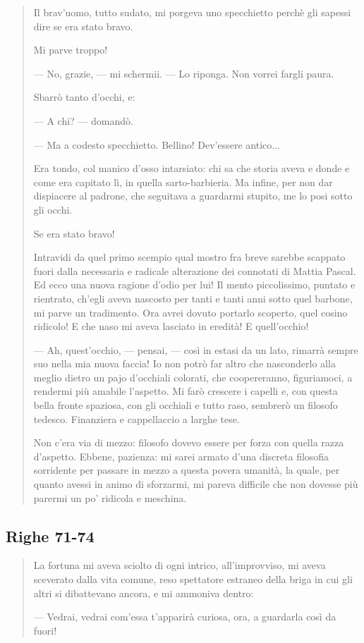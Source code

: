 \documentclass[a4paper, twoside, titlepage]{book}
\newcounter{mar}
\begin{document}
\begin{quotation}
Il brav’uomo, tutto sudato, mi porgeva uno specchietto perchè gli sapessi dire se era stato bravo.

Mi parve troppo!

— No, grazie, — mi schermii. — Lo riponga. Non vorrei fargli paura.

Sbarrò tanto d’occhi, e:

— A chi? — domandò.

— Ma a codesto specchietto. Bellino! Dev’essere antico...

Era tondo, col manico d’osso intarsiato: chi sa che storia aveva e donde e come era capitato lì, in quella sarto-barbieria. Ma infine, per non dar dispiacere al padrone, che seguitava a guardarmi stupito, me lo posi sotto gli occhi.

Se era stato bravo!

Intravidi da quel primo scempio qual mostro fra breve sarebbe scappato fuori dalla necessaria e radicale alterazione dei connotati di Mattia Pascal. Ed ecco una nuova ragione d’odio per lui! Il mento piccolissimo, puntato e rientrato, ch’egli aveva nascosto per tanti e tanti anni sotto quel barbone, mi parve un tradimento. Ora avrei dovuto portarlo scoperto, quel cosino ridicolo! E che naso mi aveva lasciato in eredità! E quell’occhio!

— Ah, quest’occhio, — pensai, — così in estasi da un lato, rimarrà sempre suo nella mia nuova faccia! Io non potrò far altro che nasconderlo alla meglio dietro un pajo d’occhiali colorati, che coopereranno, figuriamoci, a rendermi più amabile l’aspetto. Mi farò crescere i capelli e, con questa bella fronte spaziosa, con gli occhiali e tutto raso, sembrerò un filosofo tedesco. Finanziera e cappellaccio a larghe tese.

Non c’era via di mezzo: filosofo dovevo essere per forza con quella razza d’aspetto. Ebbene, pazienza: mi sarei armato d’una discreta filosofia sorridente per passare in mezzo a questa povera umanità, la quale, per quanto avessi in animo di sforzarmi, mi pareva difficile che non dovesse più parermi un po’ ridicola e meschina.
\end{quotation}

\subsection*{Righe 71-74}

\begin{quotation}
La fortuna mi aveva sciolto di ogni intrico, all’improvviso, mi aveva sceverato dalla vita comune, reso spettatore estraneo della briga in cui gli altri si dibattevano ancora, e mi ammoniva dentro:

— Vedrai, vedrai com’essa t’apparirà curiosa, ora, a guardarla così da fuori!
\end{quotation}
\end{document}
